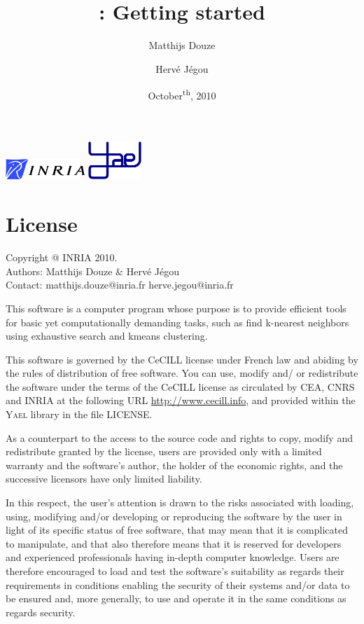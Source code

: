 \documentclass[a4paper,11pt,notitlepage,final,twoside]{report}
\title{~\vspace{9cm} \\ \yael: Getting started}
\author{Matthijs Douze \and Herv\'e J\'egou}
\date{October\textsuperscript{th}, 2010}
\newcommand{\yael}{\textsc{Yael}\xspace}
\begin{document}
\maketitle
\thispagestyle{empty}

\vfill

\includegraphics[width=3cm]{./figs/logoinria} \hfill \includegraphics[width=2cm]{./figs/logoyael} 


\newpage

\chapter*{License}

\thispagestyle{empty}

Copyright @ INRIA 2010. \\
Authors: Matthijs Douze \& Herv\'e J\'egou \\
Contact: matthijs.douze@inria.fr  herve.jegou@inria.fr \\
\medskip

This software is a computer program whose purpose is to provide 
efficient tools for basic yet computationally demanding tasks, 
such as find k-nearest neighbors using exhaustive search 
and kmeans clustering. 
\medskip

This software is governed by the CeCILL license under French law and
abiding by the rules of distribution of free software.  You can  use, 
modify and/ or redistribute the software under the terms of the CeCILL
license as circulated by CEA, CNRS and INRIA at the following URL
\url{http://www.cecill.info}, and provided within the \yael library 
in the file LICENSE. 
\medskip

As a counterpart to the access to the source code and  rights to copy,
modify and redistribute granted by the license, users are provided only
with a limited warranty  and the software's author,  the holder of the
economic rights,  and the successive licensors  have only  limited
liability. 
\medskip

In this respect, the user's attention is drawn to the risks associated
with loading,  using,  modifying and/or developing or reproducing the
software by the user in light of its specific status of free software,
that may mean  that it is complicated to manipulate,  and  that  also
therefore means  that it is reserved for developers  and  experienced
professionals having in-depth computer knowledge. Users are therefore
encouraged to load and test the software's suitability as regards their
requirements in conditions enabling the security of their systems and/or 
data to be ensured and,  more generally, to use and operate it in the 
same conditions as regards security. 
\medskip
\end{document}
